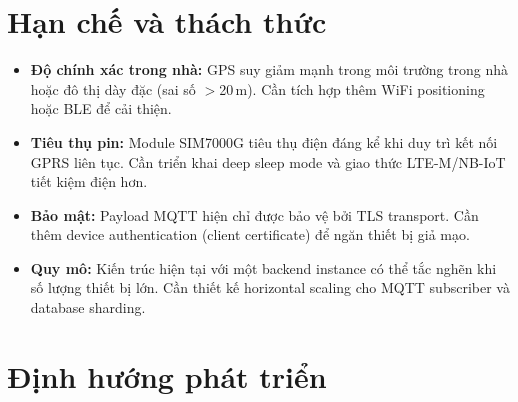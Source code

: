 \section{Hạn chế và thách thức}

\begin{itemize}
  \item \textbf{Độ chính xác trong nhà:} GPS suy giảm mạnh trong môi trường trong nhà hoặc đô thị dày đặc (sai số $>$20\,m). Cần tích hợp thêm WiFi positioning hoặc BLE để cải thiện.

  \item \textbf{Tiêu thụ pin:} Module SIM7000G tiêu thụ điện đáng kể khi duy trì kết nối GPRS liên tục. Cần triển khai deep sleep mode và giao thức LTE-M/NB-IoT tiết kiệm điện hơn.

  \item \textbf{Bảo mật:} Payload MQTT hiện chỉ được bảo vệ bởi TLS transport. Cần thêm device authentication (client certificate) để ngăn thiết bị giả mạo.

  \item \textbf{Quy mô:} Kiến trúc hiện tại với một backend instance có thể tắc nghẽn khi số lượng thiết bị lớn. Cần thiết kế horizontal scaling cho MQTT subscriber và database sharding.
\end{itemize}

\section{Định hướng phát triển}

